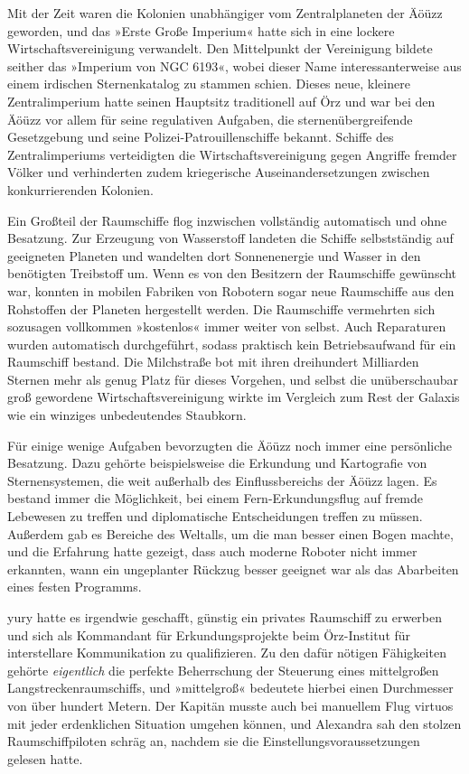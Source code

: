 Mit der Zeit waren die Kolonien unabhängiger vom Zentralplaneten der Äöüzz geworden, und das »Erste Große Imperium« hatte sich in eine lockere Wirtschaftsvereinigung verwandelt. Den Mittelpunkt der Vereinigung bildete seither das »Imperium von NGC 6193«, wobei dieser Name interessanterweise aus einem irdischen Sternenkatalog zu stammen schien. Dieses neue, kleinere Zentralimperium hatte seinen Hauptsitz traditionell auf Örz und war bei den Äöüzz vor allem für seine regulativen Aufgaben, die sternenübergreifende Gesetzgebung und seine Polizei-Patrouillenschiffe bekannt. Schiffe des Zentralimperiums verteidigten die Wirtschaftsvereinigung gegen Angriffe fremder Völker und verhinderten zudem kriegerische Auseinandersetzungen zwischen konkurrierenden Kolonien.

Ein Großteil der Raumschiffe flog inzwischen vollständig automatisch und ohne Besatzung. Zur Erzeugung von Wasserstoff landeten die Schiffe selbstständig auf geeigneten Planeten und wandelten dort Sonnenenergie und Wasser in den benötigten Treibstoff um. Wenn es von den Besitzern der Raumschiffe gewünscht war, konnten in mobilen Fabriken von Robotern sogar neue Raumschiffe aus den Rohstoffen der Planeten hergestellt werden. Die Raumschiffe vermehrten sich sozusagen vollkommen »kostenlos« immer weiter von selbst. Auch Reparaturen wurden automatisch durchgeführt, sodass praktisch kein Betriebsaufwand für ein Raumschiff bestand. Die Milchstraße bot mit ihren dreihundert Milliarden Sternen mehr als genug Platz für dieses Vorgehen, und selbst die unüberschaubar groß gewordene Wirtschaftsvereinigung wirkte im Vergleich zum Rest der Galaxis wie ein winziges unbedeutendes Staubkorn.

Für einige wenige Aufgaben bevorzugten die Äöüzz noch immer eine persönliche Besatzung. Dazu gehörte beispielsweise die Erkundung und Kartografie von Sternensystemen, die weit außerhalb des Einflussbereichs der Äöüzz lagen. Es bestand immer die Möglichkeit, bei einem Fern-Erkundungsflug auf fremde Lebewesen zu treffen und diplomatische Entscheidungen treffen zu müssen. Außerdem gab es Bereiche des Weltalls, um die man besser einen Bogen machte, und die Erfahrung hatte gezeigt, dass auch moderne Roboter nicht immer erkannten, wann ein ungeplanter Rückzug besser geeignet war als das Abarbeiten eines festen Programms.

yury hatte es irgendwie geschafft, günstig ein privates Raumschiff zu erwerben und sich als Kommandant für Erkundungsprojekte beim Örz-Institut für interstellare Kommunikation zu qualifizieren. Zu den dafür nötigen Fähigkeiten gehörte \textit{eigentlich} die perfekte Beherrschung der Steuerung eines mittelgroßen Langstreckenraumschiffs, und »mittelgroß« bedeutete hierbei einen Durchmesser von über hundert Metern. Der Kapitän musste auch bei manuellem Flug virtuos mit jeder erdenklichen Situation umgehen können, und Alexandra sah den stolzen Raumschiffpiloten schräg an, nachdem sie die Einstellungsvoraussetzungen gelesen hatte.

